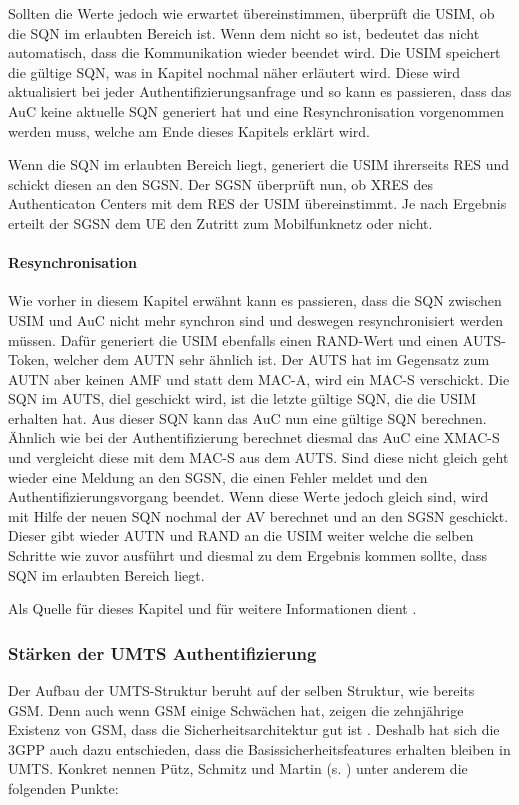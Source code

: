  Sollten die Werte jedoch wie erwartet übereinstimmen, überprüft die USIM, ob die SQN im erlaubten
 Bereich ist. Wenn dem nicht so ist, bedeutet das nicht automatisch, dass die Kommunikation wieder
 beendet wird. Die USIM speichert die gültige SQN, was in Kapitel 
 nochmal näher erläutert wird. Diese wird aktualisiert bei jeder Authentifizierungsanfrage und so kann
 es passieren, dass das AuC keine aktuelle SQN generiert hat und eine Resynchronisation vorgenommen
 werden muss, welche am Ende dieses Kapitels erklärt wird.
 
 Wenn die SQN im erlaubten Bereich liegt, generiert die USIM ihrerseits RES und schickt diesen an
 den SGSN. Der SGSN überprüft nun, ob XRES des Authenticaton Centers mit dem RES der USIM
 übereinstimmt. Je nach Ergebnis erteilt der SGSN dem \ac{UE} den Zutritt zum Mobilfunknetz oder
 nicht.
 
 \paragraph{Resynchronisation}
 \label{par:resynchronisation}
  Wie vorher in diesem Kapitel erwähnt kann es passieren, dass die SQN zwischen USIM und AuC
  nicht mehr synchron sind und deswegen resynchronisiert werden müssen. Dafür generiert die
  USIM ebenfalls einen RAND-Wert und einen AUTS-Token, welcher dem AUTN sehr ähnlich ist.
  Der AUTS hat im Gegensatz zum AUTN aber keinen AMF und statt dem MAC-A, wird ein MAC-S
  verschickt. Die SQN im AUTS, diel geschickt wird, ist die letzte gültige SQN, die die USIM erhalten
  hat. Aus dieser SQN kann das AuC nun eine gültige SQN berechnen. \\
  Ähnlich wie bei der Authentifizierung berechnet diesmal das AuC eine XMAC-S und vergleicht
  diese mit dem MAC-S aus dem AUTS. Sind diese nicht gleich geht wieder eine Meldung an den
  SGSN, die einen Fehler meldet und den Authentifizierungsvorgang beendet. Wenn diese Werte
  jedoch gleich sind, wird mit Hilfe der neuen SQN nochmal der AV berechnet und an den SGSN
  geschickt. Dieser gibt wieder AUTN und RAND an die USIM weiter welche die selben Schritte
  wie zuvor ausführt und diesmal zu dem Ergebnis kommen sollte, dass SQN im erlaubten
  Bereich liegt.
  
  Als Quelle für dieses Kapitel und für weitere Informationen dient \cite{3gpp.33.102}.
  
 \subsubsection{Stärken der UMTS Authentifizierung}
 Der Aufbau der \ac{UMTS}-Struktur beruht auf der selben Struktur, wie bereits \ac{GSM}.
 Denn auch wenn GSM einige Schwächen hat, zeigen die zehnjährige Existenz von GSM,
 dass die Sicherheitsarchitektur gut ist \cite{putz01}. Deshalb hat sich die \ac{3GPP} auch
 dazu entschieden, dass die Basis\-sicherheits\-features erhalten bleiben in UMTS. Konkret
 nennen Pütz, Schmitz und Martin (s. \cite{putz01}) unter anderem die folgenden Punkte:
 

